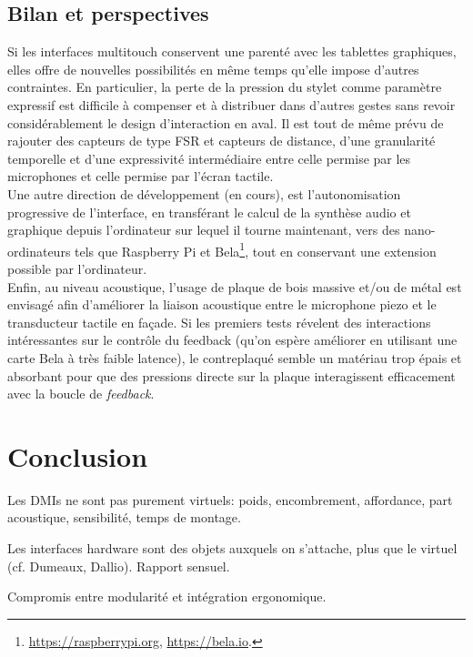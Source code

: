 \subsection{Bilan et perspectives}

\noindent Si les interfaces multitouch conservent une parenté avec les tablettes graphiques, elles offre de nouvelles possibilités en même temps qu'elle impose d'autres contraintes. En particulier, la perte de la pression du stylet comme paramètre expressif est difficile à compenser et à distribuer dans d'autres gestes sans revoir considérablement le design d'interaction en aval. Il est tout de même prévu de rajouter des capteurs de type \gls{FSR} et capteurs de distance, d'une granularité temporelle et d'une expressivité intermédiaire entre celle permise par les microphones et celle permise par l'écran tactile.\\
\indent Une autre direction de développement (en cours), est l'autonomisation progressive de l'interface, en transférant le calcul de la synthèse audio et graphique depuis l'ordinateur sur lequel il tourne maintenant, vers des nano-ordinateurs tels que Raspberry Pi et Bela\footnote{\url{https://raspberrypi.org}, \url{https://bela.io}.}, tout en conservant une extension possible par l'ordinateur.\\
\indent Enfin, au niveau acoustique, l'usage de plaque de bois massive et/ou de métal est envisagé afin d'améliorer la liaison acoustique entre le microphone piezo et le transducteur tactile en façade. Si les premiers tests révelent des interactions intéressantes sur le contrôle du feedback (qu'on espère améliorer en utilisant une carte Bela à très faible latence), le contreplaqué semble un matériau trop épais et absorbant pour que des pressions directe sur la plaque interagissent efficacement avec la boucle de \textit{feedback}.


\section{Conclusion}
\label{sec:interfaces:conclusion}

Les DMIs ne sont pas purement virtuels: poids, encombrement, affordance, part acoustique, sensibilité, temps de montage.

Les interfaces hardware sont des objets auxquels on s'attache, plus que le virtuel (cf. Dumeaux, Dallio). Rapport sensuel.

Compromis entre modularité et intégration ergonomique.

